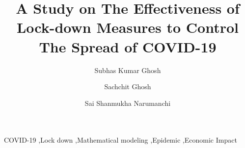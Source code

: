 \documentclass[preprint,authoryear,12pt]{elsarticle}
\begin{document}
	
	\begin{frontmatter}
		
		
		
		\title{A Study on The Effectiveness of Lock-down Measures to Control The Spread of COVID-19}
		
		
		\author[a1]{Subhas Kumar Ghosh}
		\author[a2]{Sachchit Ghosh}
		\author[a3]{Sai Shanmukha Narumanchi}
	
		
		\address[a1]{Commonwealth Bank of Australia, Sydney, New South Wales, 2000, Australia}
		\address[a2]{The University of Sydney, Camperdown, NSW 2006, Australia}
		\address[a3]{Department of Computer Science, Southern Illinois University, Carbondale, IL 62901, USA.}
	
		
		\begin{abstract}
			
		\end{abstract}
		
		\begin{keyword}
			COVID-19 \sep Lock down \sep Mathematical modeling \sep Epidemic \sep Economic Impact
			
			
		\end{keyword}
		
	\end{frontmatter}
	
\end{document}
